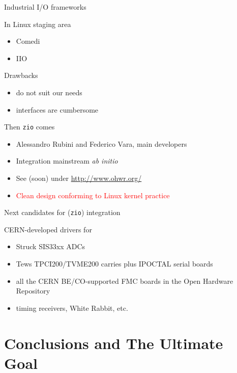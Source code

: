 \documentclass[compress,red]{beamer}
\begin{document}
\begin{frame}{Industrial I/O frameworks}

\pause
\begin{block}{In Linux staging area}
\begin{itemize}
\item Comedi
\item IIO
\end{itemize}
\end{block}

\pause
\begin{block}{Drawbacks}
\begin{itemize}
\item do not suit our needs
\item interfaces are cumbersome
\end{itemize}
\end{block}

\pause
\begin{block}{Then \texttt{zio} comes}
\begin{itemize}
\item Alessandro Rubini and Federico Vara, main developers
\item Integration mainstream \emph{ab initio}
\item See (soon) under \url{http://www.ohwr.org/}
\pause\item \textcolor{red}{Clean design conforming to Linux kernel practice}
\end{itemize}
\end{block}

\end{frame}

\begin{frame}{Next candidates for (\texttt{zio}) integration}

CERN-developed drivers for
\begin{itemize}
\pause
\item Struck SIS33xx ADCs
\pause
\item Tews TPCI200/TVME200 carries plus IPOCTAL serial boards
\pause
\item all the CERN BE/CO-supported FMC boards in the Open Hardware Repository
\pause
\item timing receivers, White Rabbit, etc.
\end{itemize}
\end{frame}

\section{Conclusions and The Ultimate Goal}
\end{document}
